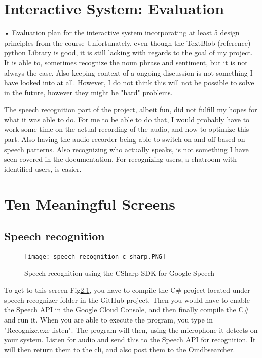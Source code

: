 \documentclass[11pt,fleqn]{book} %
\begin{document}

\chapter{Interactive System: Evaluation}
•	Evaluation plan for the interactive system incorporating at least 5 design principles from the course
Unfortunately, even though the TextBlob (reference) python Library is good, it is still lacking with regards to the goal of my project.
It is able to, sometimes recognize the noun phrase and sentiment, but it is not always the case.
Also keeping context of a ongoing discussion is not something I have looked into at all.
However, I do not think this will not be possible to solve in the future, however they might be "hard" problems.

The speech recognition part of the project, albeit fun, did not fulfill my hopes for what it was able to do. For me to be able to do that, I would probably have to work some time on the actual recording of the audio, and how to optimize this part. Also having the audio recorder being able to switch on and off based on speech patterns.
Also recognizing who actually speaks, is not something I have seen covered in the documentation.
For recognizing users, a chatroom with identified users, is easier.


\chapter{Ten Meaningful Screens}
\section{Speech recognition}
\begin{figure}[]
  \centering
   \texttt{[image: speech\_recognition\_c-sharp.PNG]}
  \caption{Speech recognition using the CSharp SDK for Google Speech}
  \label{fig:c-sharp-speech}
\end{figure}
To get to this screen Fig\ref{fig:c-sharp-speech}, you have to compile the C\# project located under speech-recognizer folder in the GitHub project. \cite{Github2017GitHubProject}
Then you would have to enable the Speech API in the Google Cloud Console, and then finally compile the C\# and run it.
When you are able to execute the program, you type in "Recognize.exe listen". The program will then, using the microphone it detects on your system. Listen for audio and send this to the Speech API for recognition. It will then return them to the cli, and also post them to the Omdbsearcher.
\end{document}
